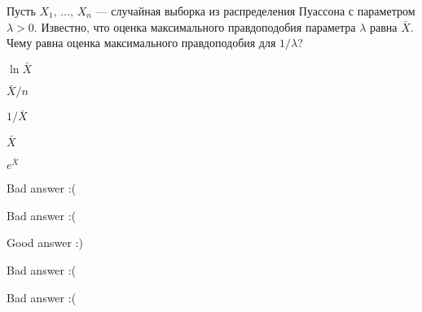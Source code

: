 
\begin{question}
Пусть \(X_1, \, \ldots, \, X_n\) --- случайная выборка из распределения
Пуассона с параметром \(\lambda > 0\). Известно, что оценка
максимального правдоподобия параметра \(\lambda\) равна \(\bar{X}\).
Чему равна оценка максимального правдоподобия для \(1 / \lambda\)?
\begin{answerlist}
  \item \(\ln \bar{X}\)
  \item \(\bar{X} / n\)
  \item \(1 / \bar{X}\)
  \item \(\bar{X}\)
  \item \(e^{\bar{X}}\)
\end{answerlist}
\end{question}

\begin{solution}
\begin{answerlist}
  \item Bad answer :(
  \item Bad answer :(
  \item Good answer :)
  \item Bad answer :(
  \item Bad answer :(
\end{answerlist}
\end{solution}

